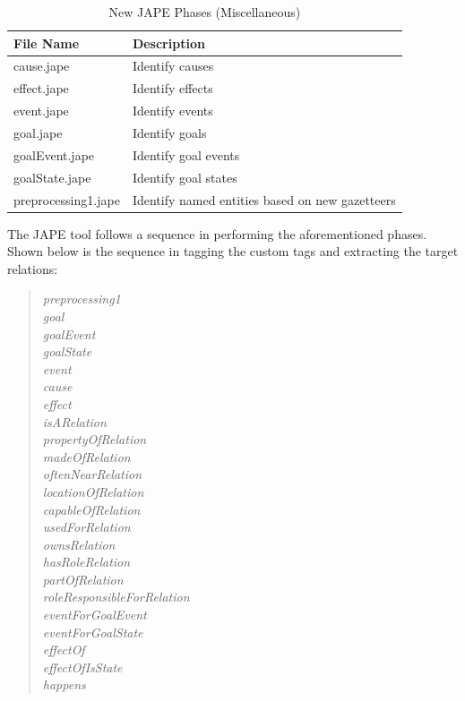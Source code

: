 \begin{table}[H]   %
\centering
\caption{New JAPE Phases (Miscellaneous)} \vspace{0.25em}
\begin{tabular}{|p{5cm}|p{5cm}|} \hline
\textbf{File Name} & \textbf{Description} \\ \hline
cause.jape				& Identify causes \\ \hline
effect.jape				& Identify effects \\ \hline
event.jape				& Identify events \\ \hline
goal.jape				& Identify goals \\ \hline
goalEvent.jape			& Identify goal events \\ \hline
goalState.jape			& Identify goal states \\ \hline
preprocessing1.jape		& Identify named entities based on new gazetteers \\ \hline
\end{tabular}
\label{tab:newjapemisc}
\end{table}

The JAPE tool follows a sequence in performing the aforementioned phases. Shown below is the sequence in tagging the custom tags and extracting the target relations:

\begin{verse}
\itshape
preprocessing1 \\
goal \\
goalEvent\\
goalState\\
event\\
cause\\
effect\\
isARelation\\
propertyOfRelation\\
madeOfRelation\\
oftenNearRelation\\
locationOfRelation\\
capableOfRelation\\
usedForRelation\\
ownsRelation\\
hasRoleRelation\\
partOfRelation\\
roleResponsibleForRelation\\
eventForGoalEvent\\
eventForGoalState\\
effectOf\\
effectOfIsState\\
happens\\
\end{verse}

